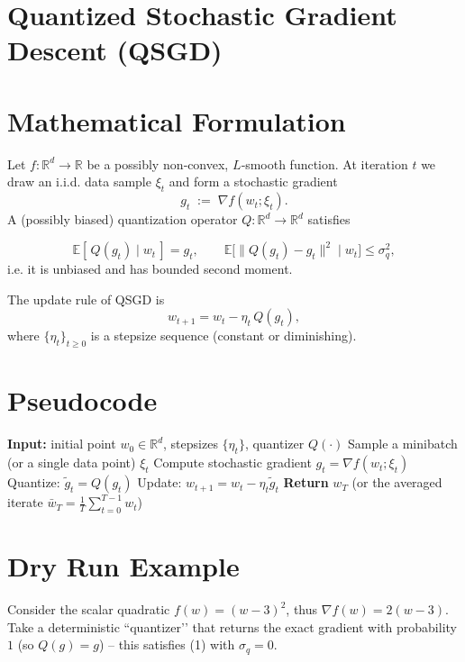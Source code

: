 \documentclass{article}
\newcommand{\E}{\mathbb{E}}
\begin{document}
\section*{Quantized Stochastic Gradient Descent (QSGD)}

\section*{Mathematical Formulation}
Let $f:\mathbb{R}^d\rightarrow\mathbb{R}$ be a possibly non‑convex, $L$‑smooth function.  
At iteration $t$ we draw an i.i.d. data sample $\xi_t$ and form a stochastic gradient
\[
g_t \;:=\; \nabla f(w_t; \xi_t).
\]
A (possibly biased) quantization operator $Q:\mathbb{R}^d\rightarrow\mathbb{R}^d$ satisfies  

\[
\boxed{\E[\,Q(g_t)\mid w_t\,]=g_t},\qquad 
\boxed{\E\big[\|Q(g_t)-g_t\|^2\mid w_t\big]\le \sigma_q^2},
\tag{1}
\]
i.e. it is unbiased and has bounded second moment.  

The update rule of QSGD is
\[
\boxed{w_{t+1}=w_t-\eta_t\,Q(g_t)},
\tag{2}
\]
where $\{\eta_t\}_{t\ge0}$ is a stepsize sequence (constant or diminishing).

\section*{Pseudocode}
\begin{algorithm}[H]
\caption{Quantized Stochastic Gradient Descent}
\begin{algorithmic}[1]
\STATE \textbf{Input:} initial point $w_0\in\mathbb{R}^d$, stepsizes $\{\eta_t\}$, quantizer $Q(\cdot)$
\STATE Sample a minibatch (or a single data point) $\xi_t$
\STATE Compute stochastic gradient $g_t=\nabla f(w_t; \xi_t)$
\STATE Quantize: $\tilde g_t = Q(g_t)$
\STATE Update: $w_{t+1}=w_t-\eta_t \tilde g_t$
\ENDFOR
\STATE \textbf{Return} $w_T$ (or the averaged iterate $\bar w_T = \frac1T\sum_{t=0}^{T-1} w_t$)
\end{algorithmic}
\end{algorithm}

\section*{Dry Run Example}
Consider the scalar quadratic $f(w)=(w-3)^2$, thus $\nabla f(w)=2(w-3)$.  
Take a deterministic “quantizer’’ that returns the exact gradient with probability $1$ (so $Q(g)=g$) – this satisfies (1) with $\sigma_q=0$.  
\end{document}
